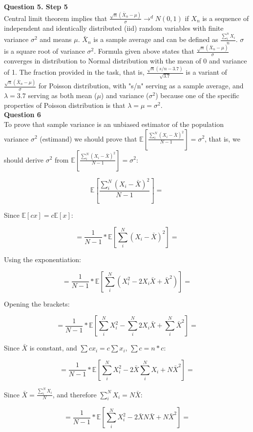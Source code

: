 \documentclass{article}
\begin{document}
\textbf{Question 5. Step 5}
\\

Central limit theorem implies that $\frac{\sqrt{n}(\bar{X}_n - \mu)}{\sigma} \rightarrow^d \mathit{N}(0,1)$ if $X_n$ is a sequence of independent and identically distributed (iid) random variables with finite variance $\sigma^2$ and means $\mu$. $\bar{X}_n$ is a sample average and can be defined as $\frac{\sum_i^n X_i}{n}$. $\sigma$ is a square root of variance $\sigma^2$. Formula given above states that $\frac{\sqrt{n}(\bar{X}_n - \mu)}{\sigma}$ converges in distribution to Normal distribution with the mean of 0 and variance of 1. The fraction provided in the task, that is, $\frac{\sqrt{n}(s/n - 3.7)}{\sqrt{3.7}}$ is a variant of $\frac{\sqrt{n}(\bar{X}_n - \mu)}{\sigma}$ for Poisson distribution, with "s/n" serving as a sample average, and $\lambda = 3.7$ serving as both mean ($\mu$) and variance ($\sigma^2$) because one of the specific properties of Poisson distribution is that $\lambda = \mu = \sigma^2$.  
\\

\textbf{Question 6}
\\

To prove that sample variance is an unbiased estimator of the population variance $\sigma^2$ (estimand) we should prove that $\mathbb{E}[ \frac{\sum_i^N (X_i - \bar{X})^2}{N-1} ]=\sigma^2$, that is, we should derive $\sigma^2$ from $\mathbb{E}[ \frac{\sum_i^N (X_i - \bar{X})^2}{N-1} ]=\sigma^2$:

$$\mathbb{E}[ \frac{\sum_i^N (X_i - \bar{X})^2}{N-1} ]=$$

Since $\mathbb{E}[cx] = c\mathbb{E}[x]$:

$$= \frac{1}{N-1} * \mathbb{E}[\sum_i^N (X_i - \bar{X})^2]=$$

Using the exponentiation:

$$= \frac{1}{N-1} * \mathbb{E}[\sum_i^N(X_i^2 - 2X_i \bar{X} + \bar{X}^2)]=$$

Opening the brackets:

$$= \frac{1}{N-1} * \mathbb{E}[\sum_i^N X_i^2 - \sum_i^N 2X_i \bar{X} + \sum_i^N \bar{X}^2]=$$

Since $\bar{X}$ is constant, and $\sum cx_i = c \sum x_i$, $\sum c = n*c$:

$$= \frac{1}{N-1} * \mathbb{E}[\sum_i^N X_i^2 - 2\bar{X} \sum_i^N X_i + N\bar{X}^2]=$$

Since $\bar{X} = \frac{\sum_i^N X_i}{N}$, and therefore $\sum_i^N X_i = N\bar{X}$:

$$= \frac{1}{N-1} * \mathbb{E}[\sum_i^N X_i^2 - 2\bar{X}N\bar{X} + N\bar{X}^2]=$$
\end{document}
